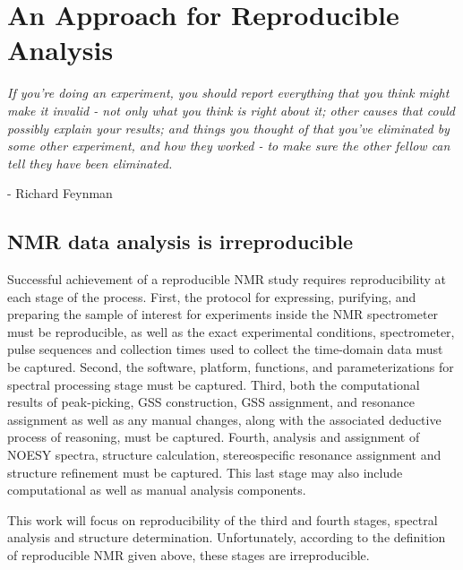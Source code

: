 \chapter{An Approach for Reproducible Analysis}

\begin{center}
  \textit{If you're doing an experiment, you should report everything that 
    you think might make it invalid - not only what you think is right about it; 
    other causes that could possibly explain your results; and things you 
    thought of that you've eliminated by some other experiment, and how they 
    worked - to make sure the other fellow can tell they have been eliminated.}

 - Richard Feynman
\end{center}



\section{NMR data analysis is irreproducible}
Successful achievement of a reproducible NMR study requires reproducibility at 
each stage of the process.  First, the protocol for expressing, purifying, and 
preparing the sample of interest for experiments inside the NMR spectrometer 
must be reproducible, as well as the exact experimental conditions, 
spectrometer, pulse sequences and collection times used to collect the 
time-domain data must be captured.  Second, the software, platform, functions, 
and parameterizations for spectral processing stage must be captured.  
Third, both the computational results of peak-picking, GSS construction,
GSS assignment, and resonance assignment as well as any manual changes, 
along with the associated deductive process of reasoning, must be captured.  
Fourth, analysis and assignment of NOESY spectra, structure calculation, 
stereospecific resonance assignment and structure refinement must be captured.  
This last stage may also include computational as well as manual analysis 
components.  

This work will focus on reproducibility of the third and fourth stages, 
spectral analysis and structure determination.  Unfortunately, according to 
the definition of reproducible NMR given above, these stages are irreproducible.

